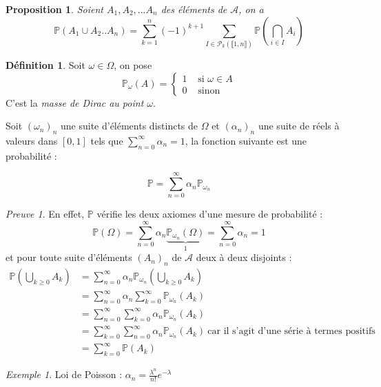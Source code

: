 \documentclass[]{article}
\newtheorem{myproposition}{Proposition}
\theoremstyle{remark}
\newtheorem{myproof}{Preuve}
\newtheorem{myexmpl}{Exemple}
\theoremstyle{definition}
\newtheorem{mydef}{Définition}
\newcommand{\prob}[1]{\mathbb{P}\left(#1\right)}
\begin{document}
\begin{myproposition}
	Soient $A_1, A_2, ... A_n$ des éléments de $\mathcal{A}$, on a $$\prob{A_1 \cup A_2 .. A_n} = \sum_{k = 1}^{n} (-1)^{k+1} \sum_{I \in \mathcal{P}_k(\llbracket 1, n\rrbracket)} \prob{\bigcap_{i \in I} A_i}$$
\end{myproposition}

\begin{mydef}
		Soit $\omega \in \Omega$, on pose $$\mathbb{P}_\omega(A) = \left\{
		\begin{array}{ll}
			1&\text{ si } \omega \in A \\
			0 & \text{ sinon}
		\end{array}\right.
		$$
		C'est la \textit{masse de Dirac au point $\omega$}.
		
		Soit $(\omega_n)_n$ une suite d'éléments distincts de $\Omega$ et $(\alpha_n)_n$ une suite de réels à valeurs dans $[0, 1]$ tels que $\displaystyle \sum_{n = 0}^{\infty} \alpha_n = 1$, la fonction suivante est une probabilité :
		
		$$\mathbb{P} = \sum_{n = 0}^{\infty} \alpha_n \mathbb{P}_{\omega_n}$$
\end{mydef}

\begin{myproof}
	En effet, $\mathbb{P}$ vérifie les deux axiomes d'une mesure de probabilité :
		$$\prob{\Omega} = \sum_{n = 0}^{\infty} \alpha_n \underbrace{\mathbb{P}_{\omega_n} (\Omega)}_{1} = \sum_{n = 0}^{\infty} \alpha_n = 1$$
		et pour toute suite d'éléments $(A_n)_n$ de $\mathcal{A}$ deux à deux disjoints :
		$$\begin{aligned}
			\prob{\bigcup_{k \geqslant 0} A_k} &= \sum_{n = 0}^{\infty} \alpha_n \mathbb{P}_{\omega_n} \left(\bigcup_{k \geqslant 0} A_k\right) \\
			&= \sum_{n=0}^{\infty} \alpha_n \sum_{k = 0}^{\infty} \mathbb{P}_{\omega_n}(A_k) \\
			&= \sum_{n = 0}^{\infty} \sum_{k = 0}^{\infty} \alpha_n \mathbb{P}_{\omega_n}(A_k) \\
			&= \sum_{k = 0}^{\infty} \sum_{n = 0}^{\infty} \alpha_n \mathbb{P}_{\omega_n}(A_k) ~ \text{car il s'agit d'une série à termes positifs} \\
			&= \sum_{k = 0}^{\infty} \prob{A_k}
		\end{aligned}$$
\end{myproof}

\begin{myexmpl} Loi de Poisson : $\alpha_n = \frac{\lambda^n}{n!} e^{- \lambda}$
\end{myexmpl}
\end{document}
